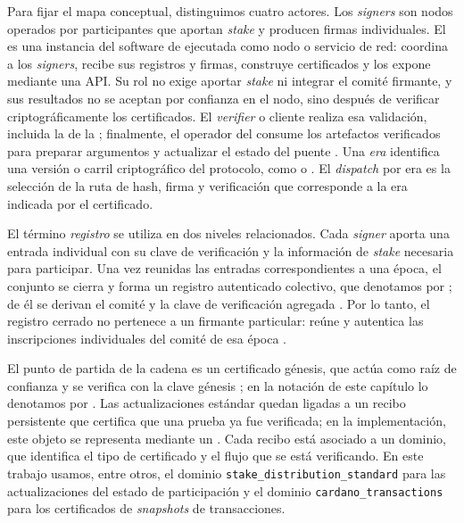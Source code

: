Para fijar el mapa conceptual, distinguimos cuatro actores. Los \textit{signers} son nodos operados por participantes que aportan \textit{stake} y producen firmas individuales. El \MithrilAggregator es una instancia del software de \Mithril ejecutada como nodo o servicio de red: coordina a los \textit{signers}, recibe sus registros y firmas, construye certificados y los expone mediante una API. Su rol no exige aportar \textit{stake} ni integrar el comité firmante, y sus resultados no se aceptan por confianza en el nodo, sino después de verificar criptográficamente los certificados. El \textit{verifier} o cliente realiza esa validación, incluida la de la \CertificateChain; finalmente, el operador del \zkBridge consume los artefactos verificados para preparar argumentos \ZK y actualizar el estado del puente \cite{MithrilDocsAggregator}. Una \emph{era} identifica una versión o carril criptográfico del protocolo, como \Pythagoras o \Lagrange. El \textit{dispatch} por era es la selección de la ruta de hash, firma y verificación que corresponde a la era indicada por el certificado.

El término \emph{registro} se utiliza en dos niveles relacionados. Cada \textit{signer} aporta una entrada individual con su clave de verificación y la información de \textit{stake} necesaria para participar. Una vez reunidas las entradas correspondientes a una época, el conjunto se cierra y forma un registro autenticado colectivo, que denotamos por \AuthReg; de él se derivan el comité y la clave de verificación agregada \AVK. Por lo tanto, el registro cerrado no pertenece a un firmante particular: reúne y autentica las inscripciones individuales del comité de esa época \cite{MithrilDocsProtocol}.

El punto de partida de la cadena es un certificado génesis, que actúa como raíz de confianza y se verifica con la clave génesis \GenesisVerificationKey; en la notación de este capítulo lo denotamos por \GenesisCertificate. Las actualizaciones estándar quedan ligadas a un recibo persistente que certifica que una prueba \STM ya fue verificada; en la implementación, este objeto se representa mediante un \ProofReceipt. Cada recibo está asociado a un dominio, que identifica el tipo de certificado y el flujo que se está verificando. En este trabajo usamos, entre otros, el dominio \texttt{stake\_distribution\_standard} para las actualizaciones del estado de participación y el dominio \texttt{cardano\_transactions} para los certificados de \textit{snapshots} de transacciones.

